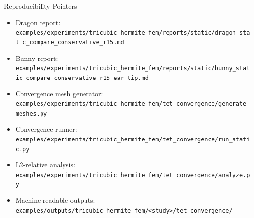 \documentclass[aspectratio=169,10pt]{beamer}
\begin{document}
\begin{frame}{Reproducibility Pointers}
  \scriptsize
  \begin{itemize}
    \item Dragon report: \texttt{examples/experiments/tricubic\_hermite\_fem/reports/static/dragon\_static\_compare\_conservative\_r15.md}
    \item Bunny report: \texttt{examples/experiments/tricubic\_hermite\_fem/reports/static/bunny\_static\_compare\_conservative\_r15\_ear\_tip.md}
    \item Convergence mesh generator: \texttt{examples/experiments/tricubic\_hermite\_fem/tet\_convergence/generate\_meshes.py}
    \item Convergence runner: \texttt{examples/experiments/tricubic\_hermite\_fem/tet\_convergence/run\_static.py}
    \item L2-relative analysis: \texttt{examples/experiments/tricubic\_hermite\_fem/tet\_convergence/analyze.py}
    \item Machine-readable outputs: \texttt{examples/outputs/tricubic\_hermite\_fem/<study>/tet\_convergence/}
  \end{itemize}
\end{frame}
\end{document}
